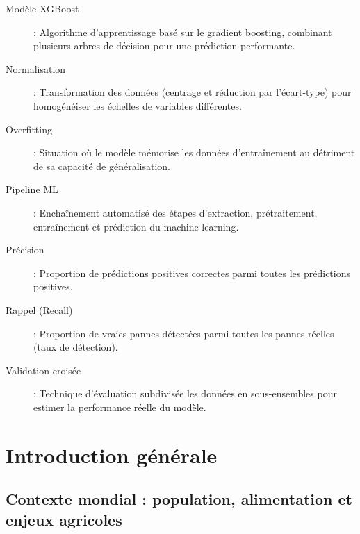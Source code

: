 \documentclass[a4paper,12pt]{report}
\begin{document}
\begin{description}
\item[Modèle XGBoost] : Algorithme d'apprentissage basé sur le gradient boosting, combinant plusieurs arbres de décision pour une prédiction performante.

\item[Normalisation] : Transformation des données (centrage et réduction par l'écart-type) pour homogénéiser les échelles de variables différentes.

\item[Overfitting] : Situation où le modèle mémorise les données d'entraînement au détriment de sa capacité de généralisation.

\item[Pipeline ML] : Enchaînement automatisé des étapes d'extraction, prétraitement, entraînement et prédiction du machine learning.

\item[Précision] : Proportion de prédictions positives correctes parmi toutes les prédictions positives.

\item[Rappel (Recall)] : Proportion de vraies pannes détectées parmi toutes les pannes réelles (taux de détection).

\item[Validation croisée] : Technique d'évaluation subdivisée les données en sous-ensembles pour estimer la performance réelle du modèle.

\end{description}

\newpage
\tableofcontents

\thispagestyle{empty}

\newpage
\listoffigures
{}
\thispagestyle{empty}

\newpage
\listoftables
{}
\thispagestyle{empty}

\newpage


\chapter*{Introduction générale}
\thispagestyle{plain}

\section*{Contexte mondial : population, alimentation et enjeux agricoles}
\end{document}
